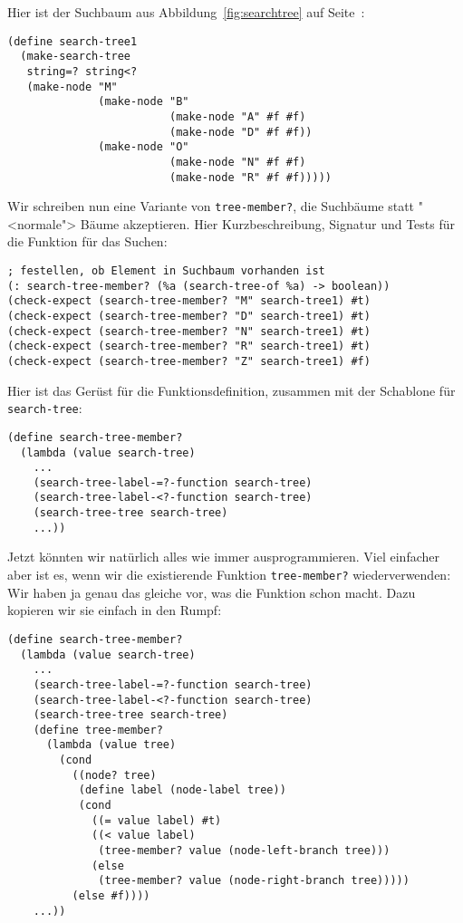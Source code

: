 Hier ist der Suchbaum aus Abbildung~\ref{fig:searchtree} auf
Seite~\pageref{fig:searchtree}:
%
\begin{lstlisting}
(define search-tree1
  (make-search-tree
   string=? string<?
   (make-node "M"
              (make-node "B"
                         (make-node "A" #f #f)
                         (make-node "D" #f #f))
              (make-node "O"
                         (make-node "N" #f #f)
                         (make-node "R" #f #f)))))
\end{lstlisting}
%
Wir schreiben nun eine Variante von \lstinline{tree-member?},
die Suchbäume statt "<normale"> Bäume
akzeptieren.  Hier Kurzbeschreibung, Signatur und Tests für die
Funktion für das Suchen:
%
\begin{lstlisting}
; festellen, ob Element in Suchbaum vorhanden ist
(: search-tree-member? (%a (search-tree-of %a) -> boolean))
(check-expect (search-tree-member? "M" search-tree1) #t)
(check-expect (search-tree-member? "D" search-tree1) #t)
(check-expect (search-tree-member? "N" search-tree1) #t)
(check-expect (search-tree-member? "R" search-tree1) #t)
(check-expect (search-tree-member? "Z" search-tree1) #f)
\end{lstlisting}
%
Hier ist das Gerüst für die Funktionsdefinition, zusammen mit der
Schablone für \lstinline{search-tree}:
%
\begin{lstlisting}
(define search-tree-member?
  (lambda (value search-tree)
    ...
    (search-tree-label-=?-function search-tree)
    (search-tree-label-<?-function search-tree)
    (search-tree-tree search-tree)
    ...))
\end{lstlisting}
%
Jetzt könnten wir natürlich alles wie immer ausprogrammieren.  Viel
einfacher aber ist es, wenn wir die existierende Funktion
\lstinline{tree-member?} wiederverwenden: Wir haben ja genau das
gleiche vor, was die Funktion schon macht.  Dazu kopieren wir sie
einfach in den Rumpf:
%
\begin{lstlisting}
(define search-tree-member?
  (lambda (value search-tree)
    ...
    (search-tree-label-=?-function search-tree)
    (search-tree-label-<?-function search-tree)
    (search-tree-tree search-tree)
    (define tree-member?
      (lambda (value tree)
        (cond
          ((node? tree)
           (define label (node-label tree))
           (cond
             ((= value label) #t)
             ((< value label)
              (tree-member? value (node-left-branch tree)))
             (else
              (tree-member? value (node-right-branch tree)))))
          (else #f))))
    ...))
\end{lstlisting}
